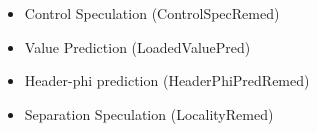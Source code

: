 \begin{itemize}
    \item Control Speculation (ControlSpecRemed)

    \item Value Prediction (LoadedValuePred)

    \item Header-phi prediction (HeaderPhiPredRemed)

    \item Separation Speculation (LocalityRemed)








\end{itemize}
